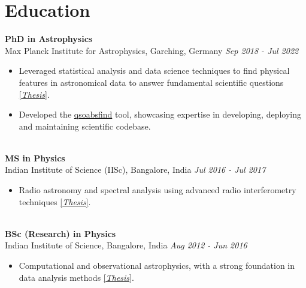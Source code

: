 \documentclass[a4paper,11pt]{article}
\begin{document}

\section*{Education}
\noindent
\textbf{PhD in Astrophysics} \\
Max Planck Institute for Astrophysics, Garching, Germany \hfill \textit{Sep 2018 - Jul 2022} \\
\begin{itemize}[noitemsep, topsep=0pt]
    \item Leveraged statistical analysis and data science techniques to find physical features in astronomical data to answer fundamental scientific questions \href{https://edoc.ub.uni-muenchen.de/30337/}{[\textit{Thesis}]}.
    \item Developed the \href{https://github.com/abhi0395/qsoabsfind}{qsoabsfind} tool, showcasing expertise in developing, deploying and maintaining scientific codebase.
\end{itemize}

\noindent\\
\textbf{MS in Physics} \\
Indian Institute of Science (IISc), Bangalore, India \hfill \textit{Jul 2016 - Jul 2017} \\
\begin{itemize}[noitemsep, topsep=0pt]
    \item Radio astronomy and spectral analysis using advanced radio interferometry techniques \href{https://raw.githubusercontent.com/abhi0395/mycv/main/files/MS_thesis.pdf}{[\textit{Thesis}]}.
\end{itemize}

\noindent\\
\textbf{BSc (Research) in Physics} \\
Indian Institute of Science, Bangalore, India \hfill \textit{Aug 2012 - Jun 2016} \\
\begin{itemize}[noitemsep, topsep=0pt]
    \item Computational and observational astrophysics, with a strong foundation in data analysis
methods \href{https://raw.githubusercontent.com/abhi0395/mycv/main/files/BS_thesis.pdf}{[\textit{Thesis}]}.
\end{itemize}
\end{document}
